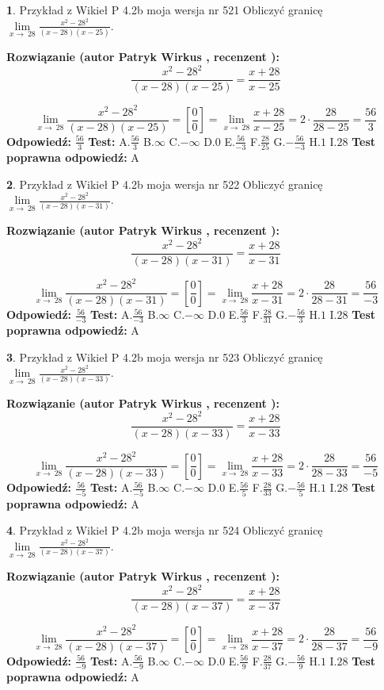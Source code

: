 \documentclass[12pt, a4paper]{article}
\theoremstyle{definition} %
\newtheorem{zad}{}
\newcommand{\zadStart}[1]{\begin{zad}#1\newline}
\newcommand{\zadStop}{\end{zad}}
\newcommand{\rozwStart}[2]{\noindent \textbf{Rozwiązanie (autor #1 , recenzent #2): }\newline}
\newcommand{\rozwStop}{\newline}
\newcommand{\odpStart}{\noindent \textbf{Odpowiedź:}\newline}
\newcommand{\odpStop}{\newline}
\newcommand{\testStart}{\noindent \textbf{Test:}\newline}
\newcommand{\testStop}{\newline}
\newcommand{\kluczStart}{\noindent \textbf{Test poprawna odpowiedź:}\newline}
\newcommand{\kluczStop}{\newline}
\begin{document}
\zadStart{Przykład z Wikieł P 4.2b moja wersja nr 521}
Obliczyć granicę $\lim\limits_{x\to\ 28}\frac{x^{2}-28^{2}}{(x-28)(x-25)}$.
\zadStop
\rozwStart{Patryk Wirkus}{}
$$\frac{x^{2}-28^{2}}{(x-28)(x-25)}=\frac{x+28}{x-25}$$

$$\lim\limits_{x\to\ 28}\frac{x^{2}-28^{2}}{(x-28)(x-25)}=[\frac{0}{0}]=\lim\limits_{x\to\ 28}\frac{x+28}{x-25}=2 \cdot \frac{28}{28-25} = \frac{56}{3}$$
\rozwStop
\odpStart
$\frac{56}{3}$
\odpStop
\testStart
A.$\frac{56}{3}$
B.$\infty$
C.$-\infty$
D.$0$
E.$\frac{56}{-3}$
F.$\frac{28}{25}$
G.$-\frac{56}{-3}$
H.$1$
I.$28$
\testStop
\kluczStart
A
\kluczStop



\zadStart{Przykład z Wikieł P 4.2b moja wersja nr 522}
Obliczyć granicę $\lim\limits_{x\to\ 28}\frac{x^{2}-28^{2}}{(x-28)(x-31)}$.
\zadStop
\rozwStart{Patryk Wirkus}{}
$$\frac{x^{2}-28^{2}}{(x-28)(x-31)}=\frac{x+28}{x-31}$$

$$\lim\limits_{x\to\ 28}\frac{x^{2}-28^{2}}{(x-28)(x-31)}=[\frac{0}{0}]=\lim\limits_{x\to\ 28}\frac{x+28}{x-31}=2 \cdot \frac{28}{28-31} = \frac{56}{-3}$$
\rozwStop
\odpStart
$\frac{56}{-3}$
\odpStop
\testStart
A.$\frac{56}{-3}$
B.$\infty$
C.$-\infty$
D.$0$
E.$\frac{56}{3}$
F.$\frac{28}{31}$
G.$-\frac{56}{3}$
H.$1$
I.$28$
\testStop
\kluczStart
A
\kluczStop



\zadStart{Przykład z Wikieł P 4.2b moja wersja nr 523}
Obliczyć granicę $\lim\limits_{x\to\ 28}\frac{x^{2}-28^{2}}{(x-28)(x-33)}$.
\zadStop
\rozwStart{Patryk Wirkus}{}
$$\frac{x^{2}-28^{2}}{(x-28)(x-33)}=\frac{x+28}{x-33}$$

$$\lim\limits_{x\to\ 28}\frac{x^{2}-28^{2}}{(x-28)(x-33)}=[\frac{0}{0}]=\lim\limits_{x\to\ 28}\frac{x+28}{x-33}=2 \cdot \frac{28}{28-33} = \frac{56}{-5}$$
\rozwStop
\odpStart
$\frac{56}{-5}$
\odpStop
\testStart
A.$\frac{56}{-5}$
B.$\infty$
C.$-\infty$
D.$0$
E.$\frac{56}{5}$
F.$\frac{28}{33}$
G.$-\frac{56}{5}$
H.$1$
I.$28$
\testStop
\kluczStart
A
\kluczStop



\zadStart{Przykład z Wikieł P 4.2b moja wersja nr 524}
Obliczyć granicę $\lim\limits_{x\to\ 28}\frac{x^{2}-28^{2}}{(x-28)(x-37)}$.
\zadStop
\rozwStart{Patryk Wirkus}{}
$$\frac{x^{2}-28^{2}}{(x-28)(x-37)}=\frac{x+28}{x-37}$$

$$\lim\limits_{x\to\ 28}\frac{x^{2}-28^{2}}{(x-28)(x-37)}=[\frac{0}{0}]=\lim\limits_{x\to\ 28}\frac{x+28}{x-37}=2 \cdot \frac{28}{28-37} = \frac{56}{-9}$$
\rozwStop
\odpStart
$\frac{56}{-9}$
\odpStop
\testStart
A.$\frac{56}{-9}$
B.$\infty$
C.$-\infty$
D.$0$
E.$\frac{56}{9}$
F.$\frac{28}{37}$
G.$-\frac{56}{9}$
H.$1$
I.$28$
\testStop
\kluczStart
A
\kluczStop
\end{document}
